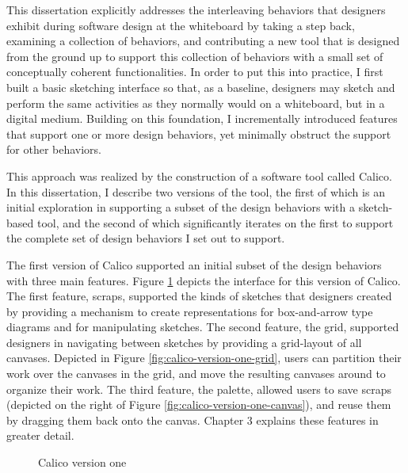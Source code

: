 \documentclass[12pt,fleqn]{ucithesis}
\begin{document}
This dissertation explicitly addresses the interleaving behaviors that designers exhibit during software design at the whiteboard by taking a step back, examining a collection of behaviors, and contributing a new tool that is designed from the ground up to support this collection of behaviors with a small set of conceptually coherent functionalities. In order to put this into practice, I first built a basic sketching interface so that, as a baseline, designers may sketch and perform the same activities as they normally would on a whiteboard, but in a digital medium. Building on this foundation, I incrementally introduced features that support one or more design behaviors, yet minimally obstruct the support for other behaviors. 

This approach was realized by the construction of a software tool called Calico. In this dissertation, I describe two versions of the tool, the first of which is an initial exploration in supporting a subset of the design behaviors with a sketch-based tool, and the second of which significantly iterates on the first to support the complete set of design behaviors I set out to support. 

The first version of Calico supported an initial subset of the design behaviors with three main features. Figure \ref{fig:calico-version-one} depicts the interface for this version of Calico. The first feature, scraps, supported the kinds of sketches that designers created by providing a mechanism to create representations for box-and-arrow type diagrams and for manipulating sketches. The second feature, the grid, supported designers in navigating between sketches by providing a grid-layout of all canvases. Depicted in Figure \ref{fig:calico-version-one-grid}, users can partition their work over the canvases in the grid, and move the resulting canvases around to organize their work. The third feature, the palette, allowed users to save scraps (depicted on the right of Figure \ref{fig:calico-version-one-canvas}), and reuse them by dragging them back onto the canvas. Chapter 3 explains these features in greater detail.

\begin{figure}
  \centering
   \caption {Calico version one}
   \label{fig:calico-version-one}
\end{figure}
\end{document}
